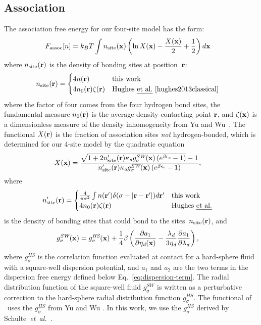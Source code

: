 \subsection{Association}

The association free energy for our four-site model has the form:
\begin{align}
  F_\text{assoc}[n] &= k_BT \int n_\text{site}(\textbf{x})
  \left(\ln X(\textbf{x}) - \frac{X(\textbf{x})}{2} + \frac12\right) d\textbf{x}
\end{align}
where $n_\text{site}(\textbf{r})$ is the density of bonding sites at
position~$\textbf{r}$:
\begin{align}
  n_\text{site}(\rr) &=
  \begin{cases}
    4 n(\rr) & \text{this work}\\
    4 n_0(\rr) \zeta(\rr) & \text{\hughesetalcite}
  \end{cases}
\end{align}
where the factor of four comes from the four hydrogen bond sites, the
fundamental measure $n_0(\textbf{r})$ is the average density contacting point
$\textbf{r}$, and $\zeta(\textbf{x})$ is a dimensionless measure of the density
inhomogeneity from Yu and
Wu~\cite{yu2002fmt-dft-inhomogeneous-associating}.  The functional
$X(\textbf{r})$ is the fraction of association sites \emph{not}
hydrogen-bonded, which is determined for our 4-site model by the
quadratic equation
\begin{align}
  X(\textbf{x}) &= \frac{\sqrt{1 + 2n_\text{site}'(\textbf{r})
      \kappa_\textit{a} g^\textit{SW}_\sigma(\textbf{x})
  \left(e^{\beta\epsilon_\textit{a}} - 1\right)} - 1}
  {n_\text{site}'(\textbf{r})
    \kappa_\textit{a} g^\textit{SW}_\sigma(\textbf{x})
  \left(e^{\beta\epsilon_\textit{a}} - 1\right)}, \label{eq:X}
\end{align}
where
\begin{align}
  n_\text{site}'(\textbf{r}) &=
  \begin{cases}
    \frac{4}{\pi\sigma^2} \int n(\textbf{r}')\delta(\sigma - |\textbf{r}-\textbf{r}'|) d\textbf{r}' & \text{this work}\\
    4 n_0(\textbf{r}) \zeta(\textbf{r}) & \text{Hughes \emph{et al.}}
  \end{cases} 
\end{align}
is the density of bonding sites that could bond to the sites~$n_\text{site}(\textbf{r})$, and
\begin{align}
  g^\textit{SW}_\sigma(\textbf{x}) &= g^\textit{HS}_\sigma(\textbf{x}) +
  \frac{1}{4}\beta\left(\frac{\partial a_1}{\partial \eta_\textit{d}(\textbf{x})} -
  \frac{\lambda_\textit{d}}{3 \eta_\textit{d}}\frac{\partial a_1}{\partial \lambda_\textit{d}}\right)\label{eq:gSW},
\end{align}
where $g^\textit{HS}_\sigma$ is the correlation function evaluated at
contact for a hard-sphere fluid with a square-well dispersion
potential, and $a_1$ and $a_2$ are the two terms in the dispersion
free energy defined below Eq.~\ref{eq:dispersion-term}.  The radial distribution function of the square-well
fluid $g^\textit{SW}_\sigma$ is written as a perturbative correction
to the hard-sphere radial distribution function
$g^\textit{HS}_\sigma$.  The functional of \hughesetal\ uses the
$g_\sigma^\textit{HS}$ from Yu and Wu
\cite{yu2002fmt-dft-inhomogeneous-associating}.  In this work, we use
the $g_\sigma^\textit{HS}$ derived by Schulte~\emph{et~al.}~\cite{schulte2012using}.

